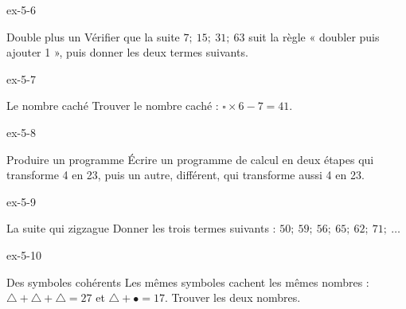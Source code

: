 \begin{blocLivre}{ex-5-6}\begin{exercice}[2]{Double plus un}
Vérifier que la suite $7 ;\ 15 ;\ 31 ;\ 63$ suit la règle « doubler puis ajouter 1 », puis donner les deux termes suivants.
\end{exercice}\end{blocLivre}
\begin{blocLivre}{ex-5-7}\begin{exercice}[2]{Le nombre caché}
Trouver le nombre caché : $\square\times6-7=41$.
\end{exercice}\end{blocLivre}
\begin{blocLivre}{ex-5-8}\begin{exercice}[2]{Produire un programme}
Écrire un programme de calcul en deux étapes qui transforme 4 en 23, puis un autre, différent, qui transforme aussi 4 en 23.
\end{exercice}\end{blocLivre}
\begin{blocLivre}{ex-5-9}\begin{exercice}[2]{La suite qui zigzague}
Donner les trois termes suivants : $50 ;\ 59 ;\ 56 ;\ 65 ;\ 62 ;\ 71 ;\ \ldots$
\end{exercice}\end{blocLivre}
\begin{blocLivre}{ex-5-10}\begin{exercice}[2]{Des symboles cohérents}
Les mêmes symboles cachent les mêmes nombres : $\triangle+\triangle+\triangle=27$ et $\triangle+\bullet=17$. Trouver les deux nombres.
\end{exercice}\end{blocLivre}

